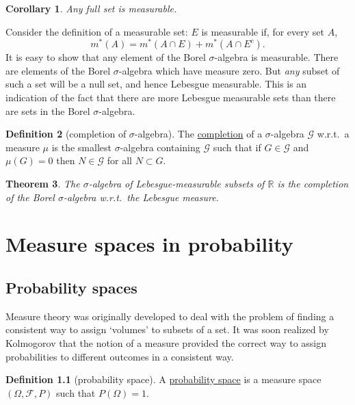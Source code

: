 \documentclass[a4paper,12pt]{scrreprt}
\newcommand{\R}{\mathbb{R}}
\newcommand{\defn}[1]{\ul{#1}}
\theoremstyle{definition}
\newtheorem{definition}{Definition}
\theoremstyle{plain}
\newtheorem{theorem}[definition]{Theorem}
\newtheorem{corollary}[definition]{Corollary}
\theoremstyle{remark}
\begin{document}
\begin{corollary}
  \label{cor:fullsetsaremeasurable}
  Any full set is measurable.
\end{corollary}

Consider the definition of a measurable set: $E$ is measurable if, for every set $A$,
\begin{equation*}
  m^{*}(A) = m^{*}(A \cap E) + m^{*}(A \cap E^{c}).
\end{equation*}
It is easy to show that any element of the Borel $\sigma$-algebra is measurable. There are elements of the Borel $\sigma$-algebra which have measure zero. But \emph{any} subset of such a set will be a null set, and hence Lebesgue measurable. This is an indication of the fact that there are more Lebesgue measurable sets than there are sets in the Borel $\sigma$-algebra.

\begin{definition}[completion of $\sigma$-algebra]
  \label{def:completionofsigmaalgebra}
  The \defn{completion} of a $\sigma$-algebra $\mathcal{G}$ w.r.t.\ a measure $\mu$ is the smallest $\sigma$-algebra containing $\mathcal{G}$ such that if $G \in \mathcal{G}$ and $\mu(G) = 0$ then $N \in \mathcal{G}$ for all $N \subset G$.
\end{definition}

\begin{theorem}
  The $\sigma$-algebra of Lebesgue-measurable subsets of $\R$ is the completion of the Borel $\sigma$-algebra w.r.t.\ the Lebesgue measure.
\end{theorem}

\chapter{Measure spaces in probability}\label{ch:measure_spaces_in_probability}

\section{Probability spaces}\label{sec:probabilityspaces}
Measure theory was originally developed to deal with the problem of finding a consistent way to assign `volumes' to subsets of a set. It was soon realized by Kolmogorov that the notion of a measure provided the correct way to assign probabilities to different outcomes in a consistent way.

\begin{definition}[probability space]
  \label{def:probabilityspace}
  A \defn{probability space} is a measure space $(\Omega, \mathcal{F}, P)$ such that $P(\Omega) = 1$.
\end{definition}
\end{document}
